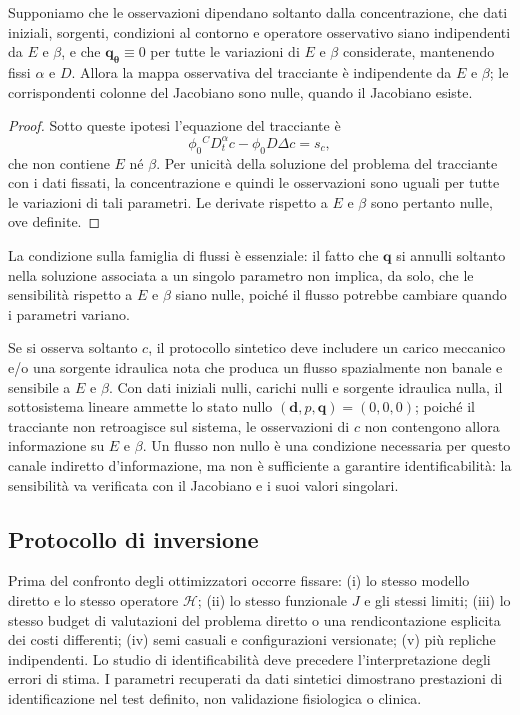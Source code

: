 \begin{proposition}
\label{prop:zeroq}
Supponiamo che le osservazioni dipendano soltanto dalla concentrazione, che dati iniziali, sorgenti, condizioni al contorno e operatore osservativo siano indipendenti da $E$ e $\beta$, e che $\mathbf q_{\boldsymbol\theta}\equiv0$ per tutte le variazioni di $E$ e $\beta$ considerate, mantenendo fissi $\alpha$ e $D$. Allora la mappa osservativa del tracciante è indipendente da $E$ e $\beta$; le corrispondenti colonne del Jacobiano sono nulle, quando il Jacobiano esiste.
\end{proposition}
\begin{proof}
Sotto queste ipotesi l'equazione del tracciante è
\[
\phi_0{}^C D_t^\alpha c-\phi_0D\Delta c=s_c,
\]
che non contiene $E$ né $\beta$. Per unicità della soluzione del problema del tracciante con i dati fissati, la concentrazione e quindi le osservazioni sono uguali per tutte le variazioni di tali parametri. Le derivate rispetto a $E$ e $\beta$ sono pertanto nulle, ove definite.
\end{proof}

La condizione sulla famiglia di flussi è essenziale: il fatto che $\mathbf q$ si annulli soltanto nella soluzione associata a un singolo parametro non implica, da solo, che le sensibilità rispetto a $E$ e $\beta$ siano nulle, poiché il flusso potrebbe cambiare quando i parametri variano.

Se si osserva soltanto $c$, il protocollo sintetico deve includere un carico meccanico e/o una sorgente idraulica nota che produca un flusso spazialmente non banale e sensibile a $E$ e $\beta$. Con dati iniziali nulli, carichi nulli e sorgente idraulica nulla, il sottosistema lineare ammette lo stato nullo $(\mathbf d,p,\mathbf q)=(0,0,0)$; poiché il tracciante non retroagisce sul sistema, le osservazioni di $c$ non contengono allora informazione su $E$ e $\beta$. Un flusso non nullo è una condizione necessaria per questo canale indiretto d'informazione, ma non è sufficiente a garantire identificabilità: la sensibilità va verificata con il Jacobiano e i suoi valori singolari.

\subsection{Protocollo di inversione}
Prima del confronto degli ottimizzatori occorre fissare: (i) lo stesso modello diretto e lo stesso operatore $\mathcal H$; (ii) lo stesso funzionale $J$ e gli stessi limiti; (iii) lo stesso budget di valutazioni del problema diretto o una rendicontazione esplicita dei costi differenti; (iv) semi casuali e configurazioni versionate; (v) più repliche indipendenti. Lo studio di identificabilità deve precedere l'interpretazione degli errori di stima. I parametri recuperati da dati sintetici dimostrano prestazioni di identificazione nel test definito, non validazione fisiologica o clinica.
